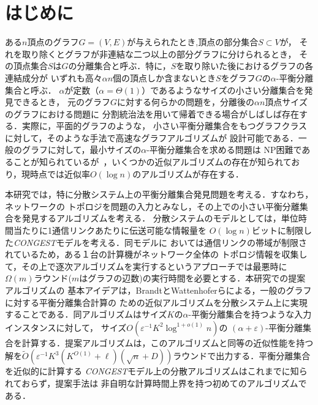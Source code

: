 \documentclass{thesis}
\theoremstyle{definition}
\begin{document}
\baselineskip=22pt
\pagestyle{empty}

\maketitle

\pagestyle{myheadings}	%
\tableofcontents

\newpage


\chapter{はじめに}

ある$n$頂点のグラフ$G=(V,E)$が与えられたとき,頂点の部分集合$S \subset V$が，
それを取り除くとグラフが非連結な二つ以上の部分グラフに分けられるとき，
その頂点集合$S$は$G$の分離集合と呼ぶ．特に，$S$を取り除いた後におけるグラフの各連結成分が
いずれも高々$\alpha n$個の頂点しか含まないとき$S$をグラフ$G$の$\alpha$-平衡分離集合と呼ぶ．
$\alpha$が定数（$\alpha = \Theta(1)$）であるようなサイズの小さい分離集合を発見できるとき，
元のグラフ$G$に対する何らかの問題を，分離後の$\alpha n$頂点サイズのグラフにおける問題に
分割統治法を用いて帰着できる場合がしばしば存在する．実際に，平面的グラフのような，
小さい平衡分離集合をもつグラフクラスに対して，そのような手法で高速なグラフアルゴリズムが
設計可能である．一般のグラフに対して，最小サイズの$\alpha$-平衡分離集合を求める問題は
NP困難であることが知られているが~\cite{bui1992finding}，いくつかの近似アルゴリズムの存在が知られており，現時点では近似率$O(\log n)$のアルゴリズムが存在する．

本研究では，特に分散システム上の平衡分離集合発見問題を考える．すなわち，ネットワークの
トポロジを問題の入力とみなし，その上での小さい平衡分離集合を発見するアルゴリズムを考える．
分散システムのモデルとしては，単位時間当たりに1通信リンクあたりに伝送可能な情報量を
$O(\log n)$ビットに制限した\textit{CONGEST}モデルを考える．同モデルに
おいては通信リンクの帯域が制限されているため，ある１台の計算機がネットワーク全体の
トポロジ情報を収集して，その上で逐次アルゴリズムを実行するというアプローチでは最悪時に
$\Omega(m)$ラウンド($m$はグラフの辺数)の実行時間を必要とする．本研究での提案アルゴリズムの
基本アイデアは，BrandtとWattenhoferらによる，一般のグラフに対する平衡分離集合計算の
ための近似アルゴリズム\cite{brandt2017approximating}を分散システム上に実現することである．同アルゴリズムはサイズ$K$の$\alpha$-平衡分離集合を持つような入力インスタンスに対して，
サイズ$O(\varepsilon^{-1}K^2\log^{1+o(1)}n)$の $(\alpha + \varepsilon)$-平衡分離集合を計算する．提案アルゴリズムは，このアルゴリズムと同等の近似性能を持つ解を$\tilde{O}(\varepsilon^{-1}K^3(K^{O(1)}+\ell)(\sqrt{n}+D))$ラウンドで出力する．平衡分離集合を近似的に計算する
\textit{CONGEST}モデル上の分散アルゴリズムはこれまでに知られておらず，提案手法は
非自明な計算時間上界を持つ初めてのアルゴリズムである．
\end{document}
